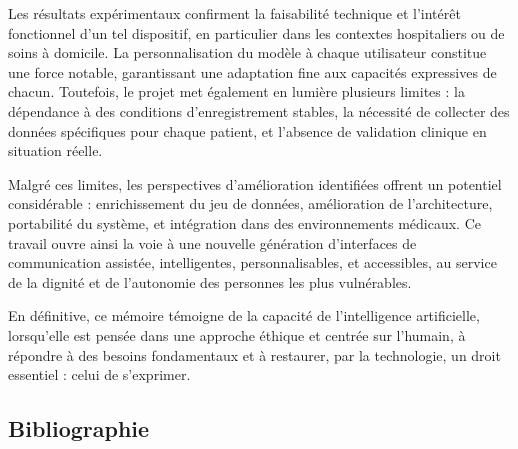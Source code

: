\documentclass[
]{article}
\begin{document}
Les résultats expérimentaux confirment la faisabilité technique et l'intérêt fonctionnel d'un tel dispositif, en particulier dans les contextes hospitaliers ou de soins à domicile. La personnalisation du modèle à chaque utilisateur constitue une force notable, garantissant une adaptation fine aux capacités expressives de chacun. Toutefois, le projet met également en lumière plusieurs limites : la dépendance à des conditions d'enregistrement stables, la nécessité de collecter des données spécifiques pour chaque patient, et l'absence de validation clinique en situation réelle.

Malgré ces limites, les perspectives d'amélioration identifiées offrent un potentiel considérable : enrichissement du jeu de données, amélioration de l'architecture, portabilité du système, et intégration dans des environnements médicaux. Ce travail ouvre ainsi la voie à une nouvelle génération d'interfaces de communication assistée, intelligentes, personnalisables, et accessibles, au service de la dignité et de l'autonomie des personnes les plus vulnérables.

En définitive, ce mémoire témoigne de la capacité de l'intelligence artificielle, lorsqu'elle est pensée dans une approche éthique et centrée sur l'humain, à répondre à des besoins fondamentaux et à restaurer, par la technologie, un droit essentiel : celui de s'exprimer.

\hypertarget{bibliographie}{%
\subsection{Bibliographie}\label{bibliographie}}
\end{document}

